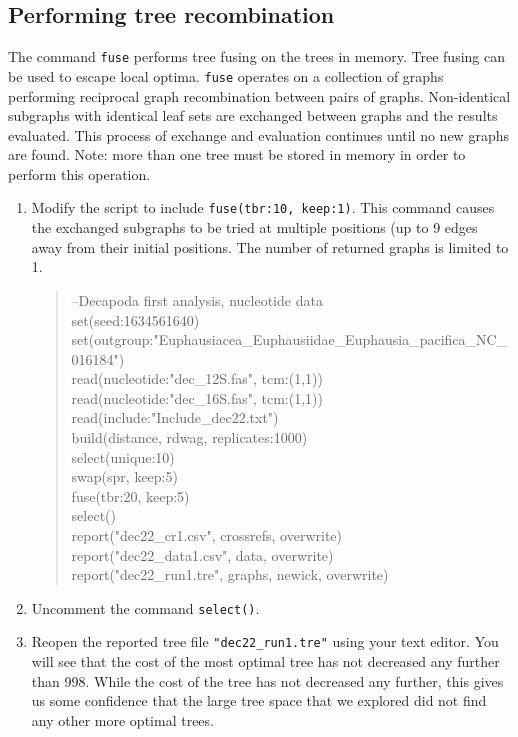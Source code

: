 \documentclass[11pt]{article}
\begin{document}
\subsection{Performing tree recombination}
\label{subsec:Fusing}

The command \texttt{fuse} performs tree fusing on the trees in memory. Tree 
fusing can be used to escape local optima. \texttt{fuse} operates on a collection 
of graphs performing reciprocal graph recombination between pairs of graphs. 
Non-identical subgraphs with identical leaf sets are exchanged between graphs 
and the results evaluated. This process of exchange and evaluation continues 
until no new graphs are found. Note: more than one tree must be stored in 
memory in order to perform this operation.

\begin{enumerate}

\item Modify the script to include \texttt{fuse(tbr:10, keep:1)}. This command 
causes the exchanged subgraphs to be tried at multiple positions (up to 9 
edges away from their initial positions. The number of returned graphs is 
limited to 1.

	\begin{quote}	
	--Decapoda first analysis, nucleotide data\\
	set(seed:1634561640)\\
	set(outgroup:"Euphausiacea\_Euphausiidae\_Euphausia\_pacifica\_NC\_016184")\\
	read(nucleotide:"dec\_12S.fas", tcm:(1,1))\\
	read(nucleotide:"dec\_16S.fas", tcm:(1,1))\\
	read(include:"Include\_dec22.txt")\\
	build(distance, rdwag, replicates:1000)\\
	select(unique:10)\\
	swap(spr, keep:5)\\
	fuse(tbr:20, keep:5)\\
	select()\\
	report("dec22\_cr1.csv", crossrefs, overwrite)\\
	report("dec22\_data1.csv", data, overwrite)\\
	report("dec22\_run1.tre", graphs, newick, overwrite)
	\end{quote}
	
\item Uncomment the command \texttt{select()}.

\item Reopen the reported tree file \texttt{"dec22\_run1.tre"} using your text editor.
You will see that the cost of the most optimal tree has not decreased any further 
than 998. While the cost of the tree has not decreased any further, this gives us
some confidence that the large tree space that we explored did not find any
other more optimal trees.

\end{enumerate}
\end{document}
